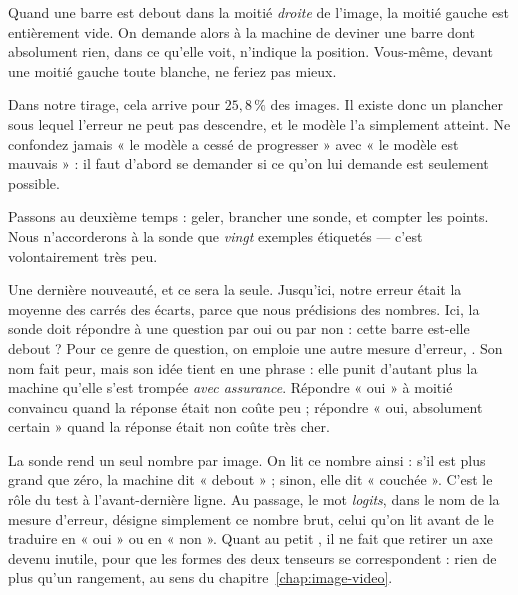 \begin{piege}
Quand une barre est debout dans la moitié \emph{droite} de l'image, la moitié
gauche est entièrement vide. On demande alors à la machine de deviner une
barre dont absolument rien, dans ce qu'elle voit, n'indique la position.
Vous-même, devant une moitié gauche toute blanche, ne feriez pas mieux.

Dans notre tirage, cela arrive pour $25{,}8\,\%$ des images. Il existe donc
un plancher sous lequel l'erreur ne peut pas descendre, et le modèle l'a
simplement atteint. Ne confondez jamais « le modèle a cessé de progresser »
avec « le modèle est mauvais » : il faut d'abord se demander si ce qu'on lui
demande est seulement possible.
\end{piege}

Passons au deuxième temps : geler, brancher une sonde, et compter les points.
Nous n'accorderons à la sonde que \emph{vingt} exemples étiquetés — c'est
volontairement très peu.

Une dernière nouveauté, et ce sera la seule. Jusqu'ici, notre erreur était la
moyenne des carrés des écarts, parce que nous prédisions des nombres. Ici, la
sonde doit répondre à une question par oui ou par non : cette barre est-elle
debout ? Pour ce genre de question, on emploie une autre mesure d'erreur,
. Son nom fait peur, mais son
idée tient en une phrase : elle punit d'autant plus la machine qu'elle s'est
trompée \emph{avec assurance}. Répondre « oui » à moitié convaincu quand la
réponse était non coûte peu ; répondre « oui, absolument certain » quand la
réponse était non coûte très cher.

La sonde rend un seul nombre par image. On lit ce nombre ainsi : s'il est
plus grand que zéro, la machine dit « debout » ; sinon, elle dit « couchée ».
C'est le rôle du test  à l'avant-dernière ligne. Au passage,
le mot \emph{logits}, dans le nom de la mesure d'erreur, désigne simplement
ce nombre brut, celui qu'on lit avant de le traduire en « oui » ou en
« non ». Quant au petit , il ne fait que retirer un
axe devenu inutile, pour que les formes des deux tenseurs se correspondent :
rien de plus qu'un rangement, au sens du chapitre~\ref{chap:image-video}.

